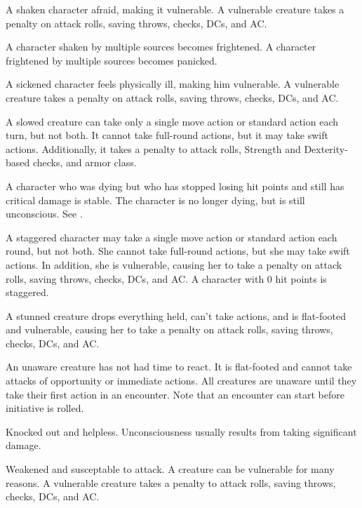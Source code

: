  A shaken character afraid, making it vulnerable. A vulnerable creature takes a  penalty on attack rolls, saving throws, checks, DCs, and AC.

A character shaken by multiple sources becomes frightened. A character frightened by multiple sources becomes panicked.

 A sickened character feels physically ill, making him vulnerable. A vulnerable creature takes a  penalty on attack rolls, saving throws, checks, DCs, and AC.

 A slowed creature can take only a single move action or standard action each turn, but not both. It cannot take full-round actions, but it may take swift actions. Additionally, it takes a  penalty to attack rolls, Strength and Dexterity-based checks, and armor class.

 A character who was dying but who has stopped losing hit points and still has critical damage is stable. The character is no longer dying, but is still unconscious. See .

 A staggered character may take a single move action or standard action each round, but not both. She cannot take full-round actions, but she may take swift actions. In addition, she is vulnerable, causing her to take a  penalty on attack rolls, saving throws, checks, DCs, and AC. A character with 0 hit points is staggered.

 A stunned creature drops everything held, can't take actions, and is flat-footed and vulnerable, causing her to take a  penalty on attack rolls, saving throws, checks, DCs, and AC.

 An unaware creature has not had time to react. It is flat-footed and cannot take attacks of opportunity or immediate actions. All creatures are unaware until they take their first action in an encounter. Note that an encounter can start before initiative is rolled.

 Knocked out and helpless. Unconsciousness usually results from taking significant damage. 

 Weakened and susceptable to attack. A creature can be vulnerable for many reasons. A vulnerable creature takes a  penalty to attack rolls, saving throws, checks, DCs, and AC.
